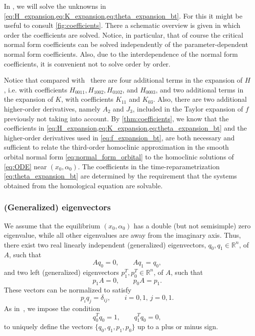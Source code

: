 %
In ,
we will solve the unknowns in
\cref{eq:H_expansion,eq:K_expansion,eq:theta_expansion_bt}. For this it might
be useful to consult \cref{fig:coefficients}. There a schematic overview is
given in which order the coefficients are solved. Notice, in particular, that
of course the critical normal form coefficients can be solved independently
of the parameter-dependent normal form coefficients. Also, due to the
interdependence of the normal form coefficients, it is convenient not to solve
order by order. 

\begin{remark}
\label{rem:correction_cmt}
Notice that compared with~\cite{Al-Hdaibat2016} there are four additional terms
in the expansion of $H$, i.e. with  coefficients $H_{0011},H_{1002},H_{0102}$,
and $H_{0003}$, and two additional terms in the expansion of $K$, with
coefficients $K_{11}$ and $K_{03}$. Also, there are two additional higher-order
derivatives, namely $A_2$ and $J_3$, included in the Taylor expansion of $f$
previously not taking into account. By \cref{thm:coefficients}, we know that
the coefficients in \cref{eq:H_expansion,eq:K_expansion,eq:theta_expansion_bt}
and the higher-order derivatives used in \cref{eq:f_expansion_bt}, are both
necessary and sufficient to relate the third-order homoclinic approximation in
the smooth orbital normal form \cref{eq:normal_form_orbital} to the homoclinic
solutions of \cref{eq:ODE} near $(x_0,\alpha_0)$. The coefficients in the
time-reparametrization \cref{eq:theta_expansion_bt} are determined by the
requirement that the systems obtained from the homological equation are
solvable.
\end{remark}

\subsubsection{(Generalized) eigenvectors}
\label{subsubsection:generalized_eigenvectors}
We assume that the equilibrium $(x_0, \alpha_0)$ has a double (but not
semisimple) zero eigenvalue, while all other eigenvalues are away from the
imaginary axis. Thus, there exist two real linearly independent (generalized)
eigenvectors, $q_0, q_1 \in \mathbb{R}^{n}$, of $A$, such that 
\begin{equation}
\label{eq:eigenvectors}
Aq_0=0,\qquad Aq_1=q_0,
\end{equation}
and two left (generalized) eigenvectors $p_1^T, p_0^T \in\mathbb{R}^{n}$,
of $A$, such that
\[
p_1 A=0,\qquad p_0 A=p_1.
\]
These vectors can be normalized to satisfy
\[
p_i q_j=\delta_{ij},\qquad i=0,1,\,j=0,1.
\]
%
As in~\cite{Kuznetsov2005practical}, we impose the condition
\begin{equation}
\label{eq:q0} 
q_0^T q_0=1,\qquad q_1^T q_0=0,
\end{equation}
to uniquely define the vectors $\{q_0,q_1,p_1,p_0\}$ up to a plus or minus sign.

